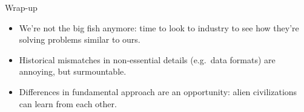 \documentclass{beamer}
\begin{document}
\begin{frame}{Wrap-up}
\vspace{0.5 cm}
\Large
\begin{itemize}\setlength{\itemsep}{0.5 cm}
\item We're not the big fish anymore: time to look to industry to see how they're solving problems similar to ours.
\item Historical mismatches in non-essential details (e.g.\ data formats) are annoying, but surmountable.
\item Differences in fundamental approach are an opportunity: alien civilizations can learn from each other.
\end{itemize}
\end{frame}
\end{document}
